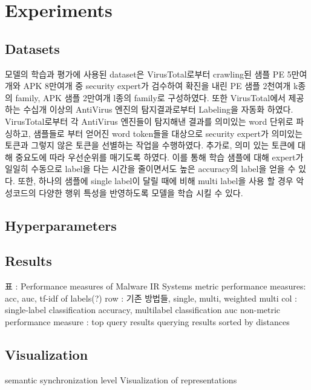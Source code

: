 \section{Experiments}
\subsection{Datasets}
모델의 학습과 평가에 사용된 dataset은 VirusTotal로부터 crawling된 샘플 PE 5만여개와 APK 8만여개 중 security expert가 검수하여 확진을 내린 PE 샘플 2천여개 k종의 family, APK 샘플 2만여개 l종의 family로 구성하였다.
또한 VirusTotal에서 제공하는 수십개 이상의 AntiVirus 엔진의 탐지결과로부터 Labeling을 자동화 하였다. VirusTotal로부터 각 AntiVirus 엔진들이 탐지해낸 결과를 의미있는 word 단위로 파싱하고, 샘플들로 부터 얻어진 word token들을 대상으로 security expert가 의미있는 토큰과 그렇지 않은 토큰을 선별하는 작업을 수행하였다. 추가로, 의미 있는 토큰에 대해 중요도에 따라 우선순위를 매기도록 하였다. 이를 통해 학습 샘플에 대해 expert가 일일히 수동으로 label을 다는 시간을 줄이면서도 높은 accuracy의 label을 얻을 수 있다. 또한, 하나의 샘플에 single label이 달릴 때에 비해 multi label을 사용 할 경우 악성코드의 다양한 행위 특성을 반영하도록 모델을 학습 시킬 수 있다. 


\subsection{Hyperparameters}


\subsection{Results}

표 : Performance measures of Malware IR Systems
metric performance measures: acc, auc, tf-idf of labels(?)
row : 기존 방법들, single, multi, weighted multi
col : single-label classification accuracy, multilabel classification auc
non-metric performance measure : top query results
querying results sorted by distances

\subsection{Visualization}
semantic synchronization level
Visualization of representations





